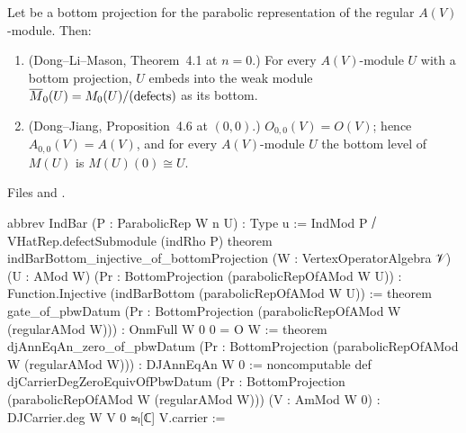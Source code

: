 \begin{theorem}\label{l13:thm:gate}
Let  be a bottom projection for the parabolic representation of the regular $A(V)$-module. Then:
\begin{enumerate}
\item (Dong--Li--Mason, Theorem~4.1 at $n=0$.) For every $A(V)$-module $U$ with a bottom projection, $U$ embeds into the
  weak module $\overline{M}_0(U) = M_0(U)/(\text{defects})$ as its bottom.
\item (Dong--Jiang, Proposition~4.6 at $(0,0)$.) $O_{0,0}(V) = O(V)$; hence $A_{0,0}(V) = A(V)$, and for every $A(V)$-module $U$
  the bottom level of $M(U)$ is $M(U)(0)\cong U$.
\end{enumerate}
\end{theorem}
\noindent Files  and
.
\begin{leancode}
abbrev IndBar (P : ParabolicRep W n U) : Type u :=
  IndMod P ⧸ VHatRep.defectSubmodule (indRho P)
theorem indBarBottom_injective_of_bottomProjection (W : VertexOperatorAlgebra 𝒱) (U : AMod W)
    (Pr : BottomProjection (parabolicRepOfAMod W U)) :
    Function.Injective (indBarBottom (parabolicRepOfAMod W U)) :=
theorem gate_of_pbwDatum (Pr : BottomProjection (parabolicRepOfAMod W (regularAMod W))) :
    OnmFull W 0 0 = O W :=
theorem djAnnEqAn_zero_of_pbwDatum
    (Pr : BottomProjection (parabolicRepOfAMod W (regularAMod W))) : DJAnnEqAn W 0 :=
noncomputable def djCarrierDegZeroEquivOfPbwDatum
    (Pr : BottomProjection (parabolicRepOfAMod W (regularAMod W))) (V : AmMod W 0) :
    DJCarrier.deg W V 0 ≃ₗ[ℂ] V.carrier :=
\end{leancode}

